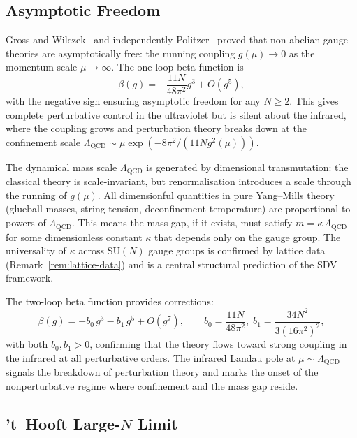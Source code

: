 \documentclass[11pt]{article}
\begin{document}
\subsection{Asymptotic Freedom}

Gross and Wilczek~\cite{GW} and independently Politzer~\cite{Pol}
proved that non-abelian gauge theories are asymptotically free: the
running coupling $g(\mu) \to 0$ as the momentum scale $\mu \to \infty$.
The one-loop beta function is
\begin{equation}\label{eq:beta-function}
  \beta(g) = -\frac{11 N}{48\pi^2} g^3 + O(g^5),
\end{equation}
with the negative sign ensuring asymptotic freedom for any $N \geq 2$.
This gives complete perturbative control in the ultraviolet but is
silent about the infrared, where the coupling grows and perturbation
theory breaks down at the confinement scale
$\Lambda_{\mathrm{QCD}} \sim \mu \exp(-8\pi^2 / (11 N g^2(\mu)))$.

The dynamical mass scale $\Lambda_{\mathrm{QCD}}$ is generated by
dimensional transmutation: the classical theory is scale-invariant, but
renormalisation introduces a scale through the running of $g(\mu)$.  All
dimensionful quantities in pure Yang--Mills theory (glueball masses,
string tension, deconfinement temperature) are proportional to powers of
$\Lambda_{\mathrm{QCD}}$.  This means the mass gap, if it exists, must
satisfy $m = \kappa\,\Lambda_{\mathrm{QCD}}$ for some dimensionless
constant $\kappa$ that depends only on the gauge group.  The universality
of $\kappa$ across $\mathrm{SU}(N)$ gauge groups is confirmed by lattice
data (Remark~\ref{rem:lattice-data}) and is a central structural prediction
of the SDV framework.

The two-loop beta function provides corrections:
\begin{equation}\label{eq:beta-two-loop}
  \beta(g) = -b_0\,g^3 - b_1\,g^5 + O(g^7),
  \qquad b_0 = \frac{11N}{48\pi^2},\;
  b_1 = \frac{34N^2}{3(16\pi^2)^2},
\end{equation}
with both $b_0, b_1 > 0$, confirming that the theory flows toward strong
coupling in the infrared at all perturbative orders.  The infrared Landau
pole at $\mu \sim \Lambda_{\mathrm{QCD}}$ signals the breakdown of
perturbation theory and marks the onset of the nonperturbative regime where
confinement and the mass gap reside.

\subsection{'t~Hooft Large-$N$ Limit}
\label{sec:large-N}
\end{document}
